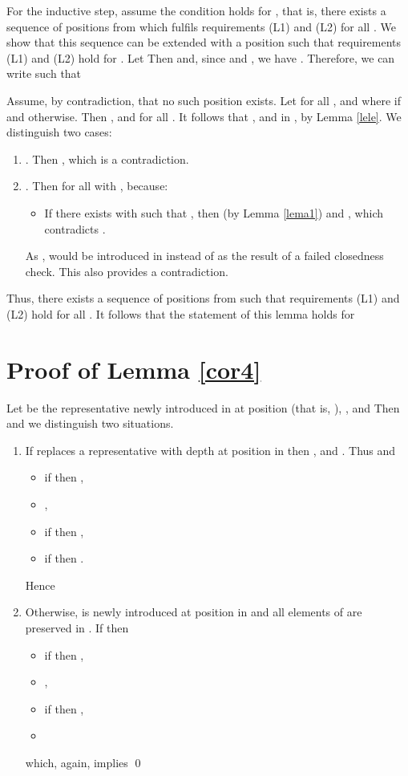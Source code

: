 \documentclass[preprint,12pt,english]{article}
\begin{document}
For the inductive step, assume the condition holds for , that is, there exists a sequence of positions 
 from  which fulfils requirements (L1) and (L2) for all . We show that this sequence can be extended with a position  such that  requirements (L1) and (L2) hold for . Let  Then  and, since  and , we have . Therefore, we can write   such that 


Assume, by contradiction, that no such position  exists. Let  for all , and  where  if  and  otherwise. Then ,
  and  for all . It follows that , and
 in , by Lemma \ref{lele}. We distinguish two cases:
\begin{enumerate}
\item . Then , which is a contradiction.
\item . Then  for all  with , because:
\begin{itemize}
\item[] If there exists  with  such that , then  (by Lemma \ref{lema1}) and , which contradicts .
\end{itemize}
As ,  would be introduced in  instead of  as the result of a failed closedness check. This also provides a contradiction.
\end{enumerate}
Thus, there exists a sequence of positions  from  such that requirements (L1) and (L2) hold for all . 
It follows that the statement of this lemma holds for 
\section{Proof of Lemma \ref{cor4}}
Let  be the representative newly introduced  in  at position  (that is, ), , and 
 Then  and we distinguish two situations.
\begin{enumerate}
\item If  replaces a representative with depth  at position  in  then ,  and . Thus  and
\begin{itemize}
\item if  then , 
\item , 
\item if  then , 
\item if  then .
\end{itemize}
Hence 
\item Otherwise,  is newly introduced at position  in  and all elements of  are preserved in . If  then
\begin{itemize}
\item if  then , 
\item , 
\item if  then ,
\item 
\end{itemize}
which, again, implies   \qed
\end{enumerate}
\end{document}
